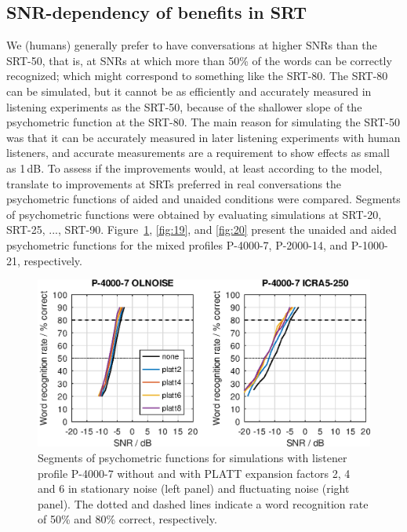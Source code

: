 \documentclass[10pt,a4paper,twocolumn]{article}
\begin{document}
\subsection*{SNR-dependency of benefits in SRT}
%
We (humans) generally prefer to have conversations at higher SNRs than the SRT-50, that is, at SNRs at which more than 50\% of the words can be correctly recognized; which might correspond to something like the SRT-80.
%
The SRT-80 can be simulated, but it cannot be as efficiently and accurately measured in listening experiments as the SRT-50, because of the shallower slope of the psychometric function at the SRT-80.
%
The main reason for simulating the SRT-50 was that it can be accurately measured in later listening experiments with human listeners, and accurate measurements are a requirement to show effects as small as 1\,dB.
%
To assess if the improvements would, at least according to the model, translate to improvements at SRTs preferred in real conversations the psychometric functions of aided and unaided conditions were compared.
%
Segments of psychometric functions were obtained by evaluating simulations at SRT-20, SRT-25, ..., SRT-90.
%
Figure~\ref{fig:18}, \ref{fig:19}, and \ref{fig:20} present the unaided and aided psychometric functions for the mixed profiles P-4000-7, P-2000-14, and P-1000-21, respectively.
%
\begin{figure}
	\centerline{\includegraphics[width=\columnwidth]{images/psyfun-P-4000-7}}
	\caption{Segments of psychometric functions for simulations with listener profile P-4000-7 without and with PLATT expansion factors 2, 4 and 6 in stationary noise (left panel) and fluctuating noise (right panel).
	The dotted and dashed lines indicate a word recognition rate of 50\% and 80\% correct, respectively.}
	\label{fig:18}
\end{figure}
%
\end{document}
